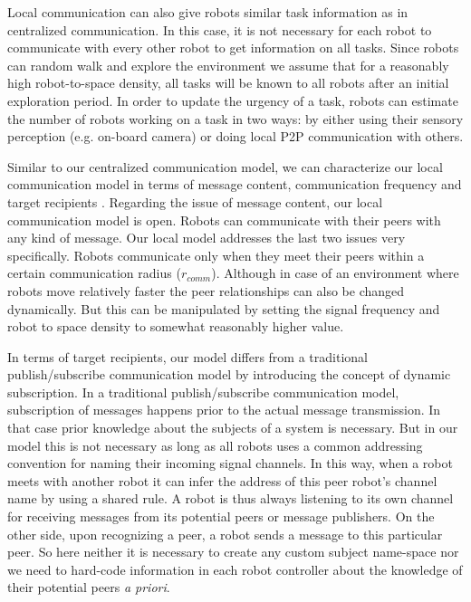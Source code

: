 \documentclass{intech}
\begin{document}
Local communication can also give robots similar task information as in centralized communication. In this case, it is not necessary for each robot to communicate with every other robot to get information on all tasks. Since robots can random walk and explore the environment we assume that for a reasonably high robot-to-space density, all tasks will be known to all robots after an initial exploration period. In order to update the urgency of a task, robots can estimate the number of robots working on a task in two ways:  by either using their sensory perception (e.g. on-board camera) or  doing local P2P communication with others.

Similar to our centralized communication model, we can characterize our local communication model in terms of message content, communication frequency and target recipients \cite{Gerkey+2001}. Regarding the issue of message content, our local communication model is open. Robots can communicate with their peers with any kind of message. Our local model addresses the last two issues very specifically. Robots communicate only when they meet their peers within a certain communication radius ($r_{comm}$). Although in case of an environment where robots move relatively faster the peer relationships can also be changed dynamically. But this can be manipulated by setting the signal frequency and robot to space density to somewhat reasonably higher value.

In terms of target recipients, our model differs from a traditional publish/subscribe communication model by introducing the concept of dynamic subscription. In a traditional publish/subscribe communication model, subscription of messages happens prior to the actual message transmission. In that case prior knowledge about the subjects of a system is necessary. But in our model this is not necessary as long as all robots uses a common addressing convention for naming their incoming signal channels. In this way, when a robot meets with another robot it can infer the address of this peer robot's channel name by using a shared rule. A robot is thus always listening to its own channel for receiving messages from its potential peers or message publishers. On the other side, upon recognizing a peer, a robot sends a message to this particular peer. So here neither it is necessary to create any custom subject name-space  \cite{Gerkey+2001} nor we need to hard-code information in each robot controller about the knowledge of their potential peers {\em a priori}. 
\end{document}
